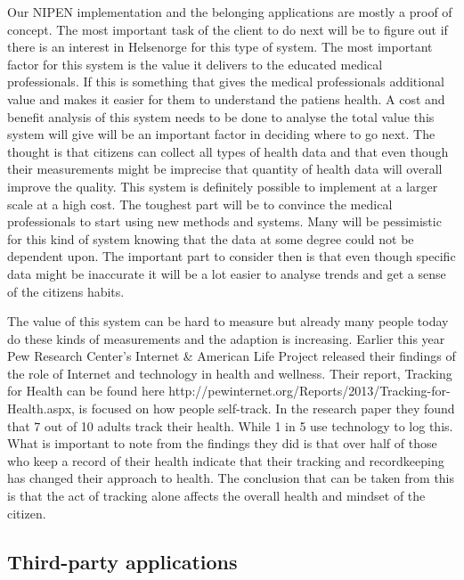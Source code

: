 \fi


\iffalse
Our NIPEN implementation and the belonging applications are mostly a proof of concept. 
The most important task of the client to do next will be to figure out if there is an interest in Helsenorge for this type of system.
The most important factor for this system is the value it delivers to the educated medical professionals. 
If this is something that gives the medical professionals additional value and makes it easier for them to understand the patiens health. 
A cost and benefit analysis of this system needs to be done to analyse the total value this system will give will be an important factor in deciding where to go next.
The thought is that citizens can collect all types of health data and that even though their measurements might be imprecise that quantity of health data will overall improve the quality.
This system is definitely possible to implement at a larger scale at a high cost.
The toughest part will be to convince the medical professionals to start using new methods and systems. 
Many will be pessimistic for this kind of system knowing that the data at some degree could not be dependent upon.
The important part to consider then is that even though specific data might be inaccurate it will be a lot easier to analyse trends and get a sense of the citizens habits. 

The value of this system can be hard to measure but already many people today do these kinds of measurements and the adaption is increasing. 
Earlier this year Pew Research Center’s Internet \& American Life Project released their findings of the role of Internet and technology in health and wellness. 
Their report, Tracking for Health can be found here http://pewinternet.org/Reports/2013/Tracking-for-Health.aspx, is focused on how people self-track.
In the research paper they found that 7 out of 10 adults track their health.
While 1 in 5 use technology to log this. 
What is important to note from the findings they did is that over half of those who keep a record of their health indicate that their tracking and recordkeeping has changed their approach to health.
The conclusion that can be taken from this is that the act of tracking alone affects the overall health and mindset of the citizen. 

\subsection{Third-party applications}


